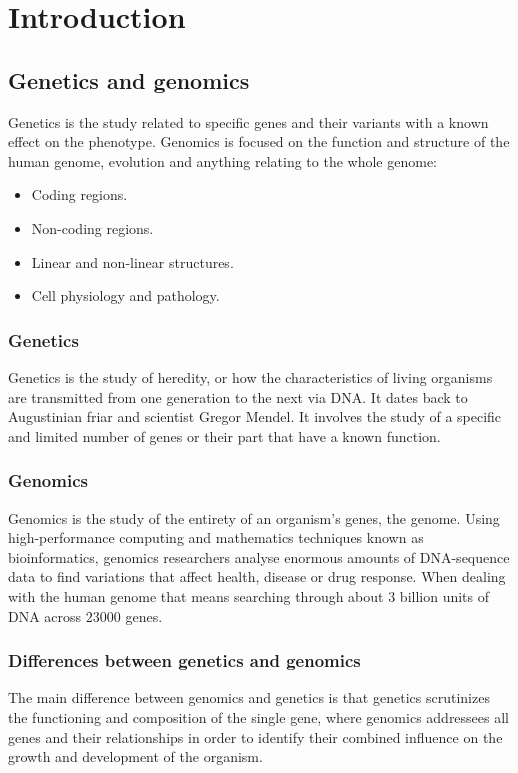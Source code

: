 \graphicspath{{chapters/01/}}
\chapter{Introduction}

\section{Genetics and genomics}
Genetics is the study related to specific genes and their variants with a known effect on the phenotype.
Genomics is focused on the function and structure of the human genome, evolution and anything relating to the whole genome:

\begin{multicols}{2}
	\begin{itemize}
		\item Coding regions.
		\item Non-coding regions.
		\item Linear and non-linear structures.
		\item Cell physiology and pathology.
	\end{itemize}
\end{multicols}

	\subsection{Genetics}
	Genetics is the study of heredity, or how the characteristics of living organisms are transmitted from one generation to the next via DNA.
	It dates back to Augustinian friar and scientist Gregor Mendel.
	It involves the study of a specific and limited number of genes or their part that have a known function.

	\subsection{Genomics}
	Genomics is the study of the entirety of an organism's genes, the genome.
	Using high-performance computing and mathematics techniques known as bioinformatics, genomics researchers analyse enormous amounts of DNA-sequence data to find variations that affect health, disease or drug response.
	When dealing with the human genome that means searching through about $3$ billion units of DNA across $23000$ genes.

	\subsection{Differences between genetics and genomics}
	The main difference between genomics and genetics is that genetics scrutinizes the functioning and composition of the single gene, where genomics addressees all genes and their relationships in order to identify their combined influence on the growth and development of the organism.

